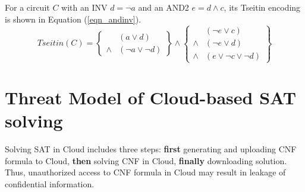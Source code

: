 \documentclass[runningheads,a4paper]{llncs}
\begin{document}
For a circuit $C$ with an INV $d=\neg a$ and an AND2 $e=d\wedge c$,
its Tseitin encoding is shown in Equation (\ref{eqn_andinv}).
\begin{equation}\label{eqn_andinv}
Tseitin(C)=\left\{
\begin{array}{cc}
& (a\vee d) \\
\wedge & (\neg a\vee \neg d)
\end{array}
\right\}\wedge\left\{
\begin{array}{cc}
& (\neg e\vee c) \\
\wedge & (\neg e\vee d) \\
\wedge & (e\vee \neg c\vee\neg d)
\end{array}
\right\}
\end{equation}


\section{Threat Model of Cloud-based SAT solving}\label{problem}

Solving SAT in Cloud includes three steps:
\textbf{first} generating and uploading CNF formula to Cloud, 
\textbf{then} solving CNF in Cloud,
\textbf{finally} downloading solution.
Thus,
unauthorized access\cite{t11} to CNF formula in Cloud may result in leakage of confidential information.




\end{document}
